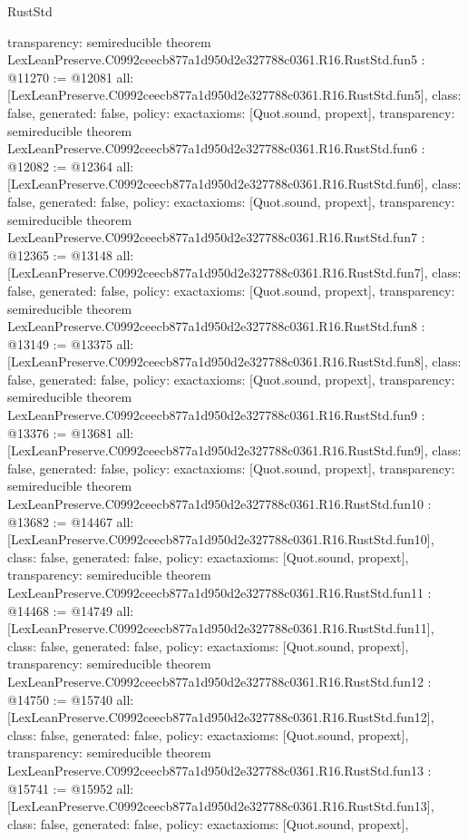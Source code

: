 \begin{lexlean}{RustStd}
\begin{coremodule}
{  transparency: semireducible
}
theorem LexLeanPreserve.C0992ceecb877a1d950d2e327788c0361.R16.RustStd.fun5 : @11270 := @12081 {
  all: [LexLeanPreserve.C0992ceecb877a1d950d2e327788c0361.R16.RustStd.fun5],
  class: false,
  generated: false,
  policy: exact{axioms: [Quot.sound, propext]},
  transparency: semireducible
}
theorem LexLeanPreserve.C0992ceecb877a1d950d2e327788c0361.R16.RustStd.fun6 : @12082 := @12364 {
  all: [LexLeanPreserve.C0992ceecb877a1d950d2e327788c0361.R16.RustStd.fun6],
  class: false,
  generated: false,
  policy: exact{axioms: [Quot.sound, propext]},
  transparency: semireducible
}
theorem LexLeanPreserve.C0992ceecb877a1d950d2e327788c0361.R16.RustStd.fun7 : @12365 := @13148 {
  all: [LexLeanPreserve.C0992ceecb877a1d950d2e327788c0361.R16.RustStd.fun7],
  class: false,
  generated: false,
  policy: exact{axioms: [Quot.sound, propext]},
  transparency: semireducible
}
theorem LexLeanPreserve.C0992ceecb877a1d950d2e327788c0361.R16.RustStd.fun8 : @13149 := @13375 {
  all: [LexLeanPreserve.C0992ceecb877a1d950d2e327788c0361.R16.RustStd.fun8],
  class: false,
  generated: false,
  policy: exact{axioms: [Quot.sound, propext]},
  transparency: semireducible
}
theorem LexLeanPreserve.C0992ceecb877a1d950d2e327788c0361.R16.RustStd.fun9 : @13376 := @13681 {
  all: [LexLeanPreserve.C0992ceecb877a1d950d2e327788c0361.R16.RustStd.fun9],
  class: false,
  generated: false,
  policy: exact{axioms: [Quot.sound, propext]},
  transparency: semireducible
}
theorem LexLeanPreserve.C0992ceecb877a1d950d2e327788c0361.R16.RustStd.fun10 : @13682 := @14467 {
  all: [LexLeanPreserve.C0992ceecb877a1d950d2e327788c0361.R16.RustStd.fun10],
  class: false,
  generated: false,
  policy: exact{axioms: [Quot.sound, propext]},
  transparency: semireducible
}
theorem LexLeanPreserve.C0992ceecb877a1d950d2e327788c0361.R16.RustStd.fun11 : @14468 := @14749 {
  all: [LexLeanPreserve.C0992ceecb877a1d950d2e327788c0361.R16.RustStd.fun11],
  class: false,
  generated: false,
  policy: exact{axioms: [Quot.sound, propext]},
  transparency: semireducible
}
theorem LexLeanPreserve.C0992ceecb877a1d950d2e327788c0361.R16.RustStd.fun12 : @14750 := @15740 {
  all: [LexLeanPreserve.C0992ceecb877a1d950d2e327788c0361.R16.RustStd.fun12],
  class: false,
  generated: false,
  policy: exact{axioms: [Quot.sound, propext]},
  transparency: semireducible
}
theorem LexLeanPreserve.C0992ceecb877a1d950d2e327788c0361.R16.RustStd.fun13 : @15741 := @15952 {
  all: [LexLeanPreserve.C0992ceecb877a1d950d2e327788c0361.R16.RustStd.fun13],
  class: false,
  generated: false,
  policy: exact{axioms: [Quot.sound, propext]},
}
\end{coremodule}
\end{lexlean}
